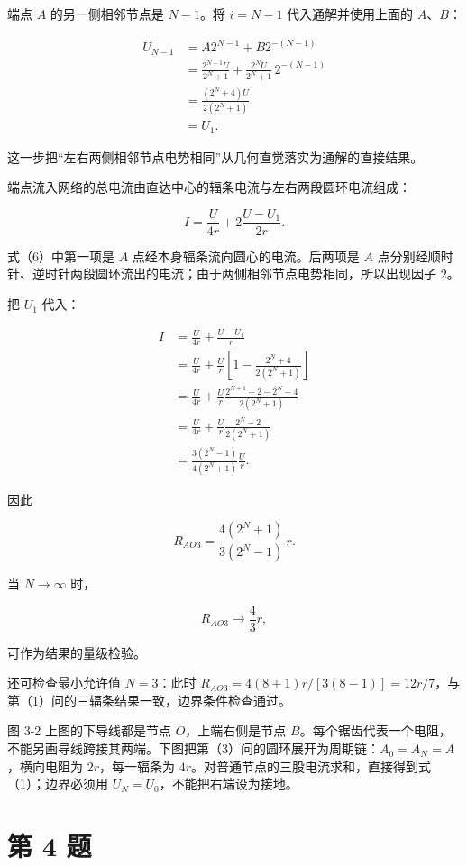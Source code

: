 \documentclass[12pt,a4paper,UTF8]{ctexart}
\begin{document}
端点 \(A\) 的另一侧相邻节点是 \(N-1\)。将 \(i=N-1\) 代入通解并使用上面的
\(A\)、\(B\)：

\[\begin{aligned}
U_{N-1}
&=A2^{N-1}+B2^{-(N-1)}\\
&=\frac{2^{N-1}U}{2^N+1}
+\frac{2^NU}{2^N+1}\,2^{-(N-1)}\\
&=\frac{(2^N+4)U}{2(2^N+1)}\\
&=U_1.
\end{aligned}\]

这一步把``左右两侧相邻节点电势相同''从几何直觉落实为通解的直接结果。

端点流入网络的总电流由直达中心的辐条电流与左右两段圆环电流组成：

\[I=\frac{U}{4r}
+2\frac{U-U_1}{2r}. \tag{6}\]

式（6）中第一项是 \(A\) 点经本身辐条流向圆心的电流。后两项是 \(A\)
点分别经顺时针、逆时针两段圆环流出的电流；由于两侧相邻节点电势相同，所以出现因子
\(2\)。

把 \(U_1\) 代入：

\[\begin{aligned}
I
&=\frac{U}{4r}+\frac{U-U_1}{r}\\
&=\frac{U}{4r}
+\frac Ur\left[1-\frac{2^N+4}{2(2^N+1)}\right]\\
&=\frac{U}{4r}
+\frac Ur\frac{2^{N+1}+2-2^N-4}{2(2^N+1)}\\
&=\frac{U}{4r}
+\frac Ur\frac{2^N-2}{2(2^N+1)}\\
&=\frac{3(2^N-1)}{4(2^N+1)}\frac Ur.
\end{aligned}\]

因此

\[\boxed{
R_{AO3}=\frac{4(2^N+1)}{3(2^N-1)}\,r
}.\]

当 \(N\to\infty\) 时，

\[R_{AO3}\longrightarrow \frac43r,\]

可作为结果的量级检验。

还可检查最小允许值 \(N=3\)：此时
\(R_{AO3}=4(8+1)r/[3(8-1)]=12r/7\)，与第（1）问的三辐条结果一致，边界条件检查通过。

图 3-2 上图的下导线都是节点 \(O\)，上端右侧是节点
\(B\)。每个锯齿代表一个电阻，不能另画导线跨接其两端。下图把第（3）问的圆环展开为周期链：\(A_0=A_N=A\)，横向电阻为
\(2r\)，每一辐条为
\(4r\)。对普通节点的三股电流求和，直接得到式（1）；边界必须用
\(U_N=U_0\)，不能把右端设为接地。

\newpage

\section{第 4 题}\label{ux7b2c-4-ux9898}
\end{document}
